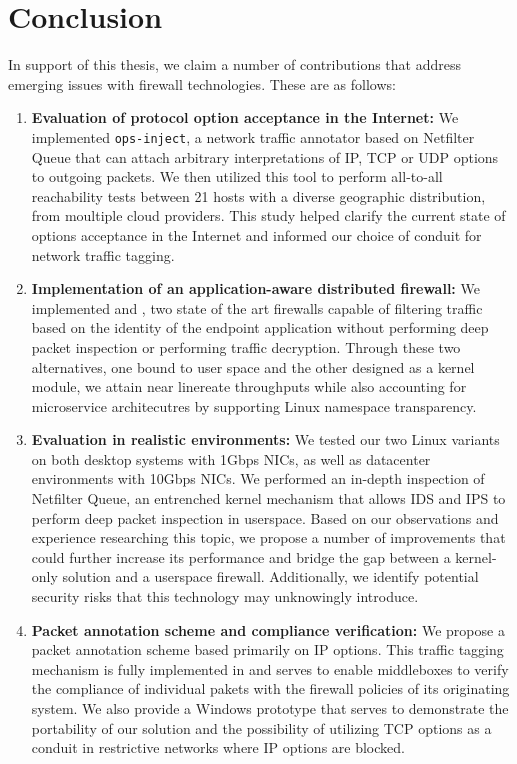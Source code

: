 \chapter{Conclusion}

In support of this thesis, we claim a number of contributions that address
emerging issues with firewall technologies. These are as follows:

\begin{enumerate}
    \item \textbf{Evaluation of protocol option acceptance in the Internet:}
    We implemented \texttt{ops-inject}, a network
    traffic annotator based on Netfilter Queue that can attach arbitrary
    interpretations of IP, TCP or UDP options to outgoing packets. We then
    utilized this tool to perform all-to-all reachability tests between 21
    hosts with a diverse geographic distribution, from moultiple cloud providers.
    This study helped clarify the current state of options acceptance in the
    Internet and informed our choice of conduit for network traffic tagging.

    \item \textbf{Implementation of an application-aware distributed firewall:}
    We implemented \daf{} and \scout{},
    two state of the art firewalls capable of filtering traffic based on the
    identity of the endpoint application without performing deep packet inspection
    or performing traffic decryption. Through these two alternatives, one
    bound to user space and the other designed as a kernel module, we attain near
    linereate throughputs while also accounting for microservice architecutres
    by supporting Linux namespace transparency.

    \item \textbf{Evaluation in realistic environments:} We tested our two Linux
    variants on both desktop systems with 1Gbps NICs, as well as datacenter
    environments with 10Gbps NICs. We performed an in-depth inspection of Netfilter
    Queue, an entrenched kernel mechanism that allows IDS and IPS to perform
    deep packet inspection in userspace. Based on our observations and experience
    researching this topic, we propose a number of
    improvements that could further increase its performance and bridge the gap
    between a kernel-only solution and a userspace firewall. Additionally, we
    identify potential security risks that this technology may unknowingly introduce.

    \item \textbf{Packet annotation scheme and compliance verification:}
    We propose a packet annotation scheme based primarily on IP options. This
    traffic tagging mechanism is fully implemented in \daf{} and serves to
    enable middleboxes to verify the compliance of individual pakets with the
    firewall policies of its originating system. We also provide a Windows
    prototype that serves to demonstrate the
    portability of our solution and the possibility of utilizing TCP options as
    a conduit in restrictive networks where IP options are blocked.


\end{enumerate}
